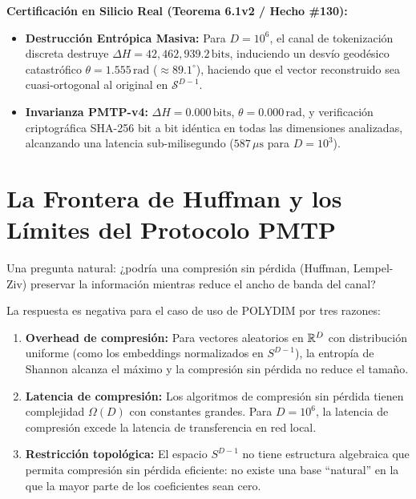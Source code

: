 \begin{certifiedbox}
\textbf{Certificación en Silicio Real (Teorema 6.1v2 / Hecho \#130):}
\begin{itemize}
    \item \textbf{Destrucción Entrópica Masiva:} Para $D = 10^6$, el canal de tokenización discreta destruye $\Delta H = 42{,}462{,}939.2\,\text{bits}$, induciendo un desvío geodésico catastrófico $\theta = 1.555\,\text{rad}$ ($\approx 89.1^\circ$), haciendo que el vector reconstruido sea cuasi-ortogonal al original en $\mathcal{S}^{D-1}$.
    \item \textbf{Invarianza PMTP-v4:} $\Delta H = 0.000\,\text{bits}$, $\theta = 0.000\,\text{rad}$, y verificación criptográfica SHA-256 bit a bit idéntica en todas las dimensiones analizadas, alcanzando una latencia sub-milisegundo ($587\,\mu\text{s}$ para $D=10^3$).
\end{itemize}
\end{certifiedbox}

\section{La Frontera de Huffman y los Límites del Protocolo PMTP}

Una pregunta natural: ¿podría una compresión sin pérdida (Huffman, Lempel-Ziv)
preservar la información mientras reduce el ancho de banda del canal?

La respuesta es negativa para el caso de uso de POLYDIM por tres razones:

\begin{enumerate}
\item \textbf{Overhead de compresión:} Para vectores aleatorios en $\mathbb{R}^D$ con
distribución uniforme (como los embeddings normalizados en $S^{D-1}$), la entropía
de Shannon alcanza el máximo y la compresión sin pérdida no reduce el tamaño.

\item \textbf{Latencia de compresión:} Los algoritmos de compresión sin pérdida
tienen complejidad $\Omega(D)$ con constantes grandes. Para $D = 10^6$, la
latencia de compresión excede la latencia de transferencia en red local.

\item \textbf{Restricción topológica:} El espacio $S^{D-1}$ no tiene estructura
algebraica que permita compresión sin pérdida eficiente: no existe una base
``natural'' en la que la mayor parte de los coeficientes sean cero.
\end{enumerate}


